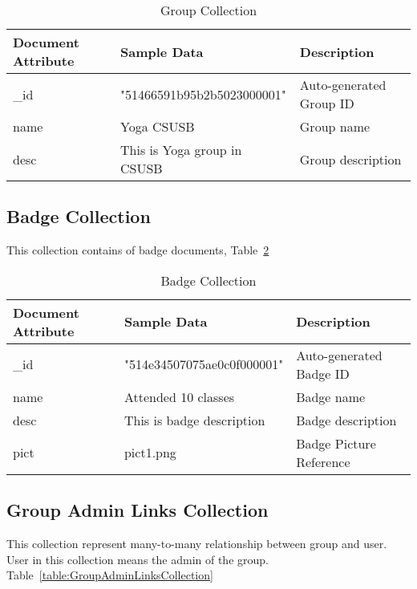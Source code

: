 \begin{table}[H]
\caption{Group Collection}\label{table:GroupCollection}
\textbf{ }
\begin{center}
\begin{tabular}{ | l | l |  l | }
\hline
Document Attribute & Sample Data & Description \\ \hline
{\_}id &  "51466591b95b2b5023000001" & Auto-generated Group ID \\ \hline
name & Yoga CSUSB & Group name   \\ \hline
desc & This is Yoga group in CSUSB & Group description   \\ \hline
\end{tabular}
\end{center}
\end{table}


\subsection{Badge Collection}
This collection contains of badge documents,  Table~\ref{table:BadgeCollection}

\begin{table}[H]
\caption{Badge Collection}\label{table:BadgeCollection}
\textbf{ }
\begin{center}
\begin{tabular}{ | l | l |  l | }
\hline
Document Attribute & Sample Data & Description \\ \hline
{\_}id & "514e34507075ae0c0f000001" & Auto-generated Badge ID \\ \hline
name & Attended 10 classes & Badge name   \\ \hline
desc & This is badge description & Badge description   \\ \hline
pict & pict1.png & Badge Picture Reference   \\ \hline
\end{tabular}
\end{center}
\end{table}


\subsection{Group Admin Links Collection}
This collection represent many-to-many relationship between group and user. User in this collection means the admin of the group. Table~\ref{table:GroupAdminLinksCollection}

